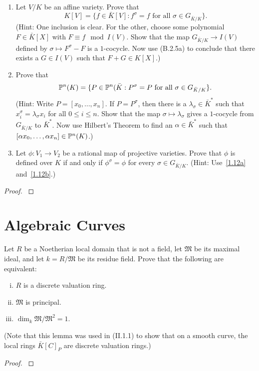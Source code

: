 \documentclass[12pt,reqno]{amsart}
\begin{document}
\begin{exe}\label{1.12}
{\ }
\begin{enumerate}
\item\label{1.12a}
Let $V/K$ be an affine variety.  Prove that
\[
K[V]=\{ f \in \bar{K}[V]: f^\sigma = f\text{ for all }\sigma \in G_{\bar{K}/K}\}.
\]
(Hint: One inclusion is clear.  For the other, choose some polynomial $F\in \bar{K}[X]$ with $F\equiv f \mod{I(V)}$.  Show that the map $G_{\bar{K}/K} \to I(V)$ defined by $\sigma \mapsto F^\sigma - F$ is a $1$-cocycle. Now use (B.2.5a) to conclude that there exists a $G\in I(V)$ such that $F+G \in K[X]$.)
\item\label{1.12b}
Prove that
\[
{\mathbb P}^n(K)=\{ P\in {\mathbb P}^n(\bar{K}: P^\sigma=P\text{ for all } \sigma \in G_{\bar{K}/K}\}.
\]
(Hint: Write $P=[x_0, \hdots, x_n]$.  If $P=P^\sigma$, then there is a $\lambda_\sigma \in \bar{K}^*$ such that $x_i^\sigma = \lambda_\sigma x_i$ for all $0 \leq i \leq n$. Show that the map $\sigma \mapsto \lambda_\sigma$ gives a $1$-cocycle from  $G_{\bar{K}/K}$ to $\bar{K}^*$.  Now use Hilbert's Theorem to find an $\alpha \in \bar{K}^*$ such that $[\alpha x_0, \hdots, \alpha x_n]\in {\mathbb P}^n(K)$.)
\item\label{1.12c}
Let $\phi: V_1 \to V_2$ be a rational map of projective varieties.  Prove that $\phi$ is defined over $K$ if and only if $\phi^\sigma = \phi$ for every $\sigma \in G_{\bar{K}/K}$.  (Hint:  Use~\ref{1.12a} and~\ref{1.12b}.)
\end{enumerate}
\begin{proof}\label{s1.12}

\end{proof} 
\end{exe} 


\newpage
\section{Algebraic Curves}\label{2}

\begin{exe}\label{2.1}
Let $R$ be a Noetherian local domain that is not a field, let $\mathfrak{M}$ be its maximal ideal, and let $k=R/\mathfrak{M}$ be its residue field.  Prove that the following are equivalent:
\begin{enumerate}[(i)]
\item
$R$ is a discrete valuation ring.
\item
$\mathfrak{M}$ is principal.
\item
$\dim_k \mathfrak{M}/\mathfrak{M}^2=1$.
\end{enumerate}
(Note that this lemma was used in (II.1.1) to show that on a smooth curve, the local rings $\bar{K}[C]_P$ are discrete valuation rings.)
\begin{proof}\label{s2.1}

\end{proof} 
\end{exe} 
\end{document}
